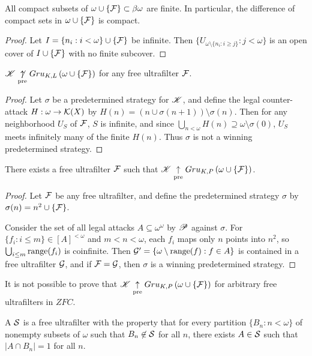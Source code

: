 \begin{lem}
  All compact subsets of $\omega\cup\{\mathcal{F}\}\subset\beta\omega$ are finite.
  In particular, the difference of compact sets in $\omega\cup\{\mathcal{F}\}$
  is compact.
\end{lem}

\begin{proof}
  Let $I=\{n_i:i<\omega\}\cup\{\mathcal{F}\}$ be infinite.
  Then $\{U_{\omega\setminus\{n_i:i\geq j\}}:j<\omega\}$ is an open cover of
  $I\cup\{\mathcal{F}\}$ with no finite subcover.
\end{proof}

\begin{thm}
  $\mathscr{K}\underset{\text{pre}}{\not\uparrow} Gru_{K,L}\left({\omega\cup\{\mathcal{F}\}}\right)$ for any free
  ultrafilter $\mathcal{F}$.
\end{thm}

\begin{proof}
  Let $\sigma$ be a predetermined strategy for $\mathscr{K}$, and define the legal
  counter-attack $H:\omega\to\mathcal{K}(X)$ by
  $H(n)=(n\cup\sigma(n+1))\setminus\sigma(n)$. Then for any neighborhood
  $U_S$ of $\mathcal{F}$, $S$ is infinite, and since
  $\bigcup_{n<\omega} H(n)\supseteq\omega\setminus\sigma(0)$, $U_S$ meets
  infinitely many of the finite $H(n)$. Thus $\sigma$ is not a winning
  predetermined strategy.
\end{proof}

\begin{thm}
  There exists a free ultrafilter $\mathcal{F}$ such that
  $\mathscr{K}\underset{\text{pre}}{\uparrow} Gru_{K,P}\left({\omega\cup\{\mathcal{F}\}}\right)$.
\end{thm}

\begin{proof}
  Let $\mathcal{F}$ be any free ultrafilter, and
  define the predetermined strategy $\sigma$ by
  $\sigma(n)=n^2\cup\{\mathcal{F}\}$.

  Consider the set of all legal attacks $A\subseteq\omega^\omega$ by
  $\mathscr{P}$ against $\sigma$. For $\{f_i:i\leq m\}\in [A]^{<\omega}$ and
  $m<n<\omega$, each $f_i$ maps only $n$ points into $n^2$, so
  $\bigcup_{i\leq m}\text{range}(f_i)$ is coinfinite.
  Then $\mathcal{G}'=\{\omega\setminus\text{range}(f) : f\in A\}$ is contained in a free
  ultrafilter $\mathcal{G}$, and if $\mathcal{F}=\mathcal{G}$, then $\sigma$ is a
  winning predetermined strategy.
\end{proof}

It is not possible to prove that $\mathscr{K}\underset{\text{pre}}{\uparrow} Gru_{K,P}\left({\omega\cup\{\mathcal{F}\}}\right)$
for arbitrary free ultrafilters in $ZFC$.

\begin{defn}
  A  $\mathcal{S}$ is a free ultrafilter with the
  property that for every
  partition $\{B_n : n < \omega\}$ of nonempty subsets of $\omega$ such that
  $B_n \not\in \mathcal{S}$ for all $n$, there exists $A \in \mathcal{S}$ such
  that $|A \cap B_n|=1$ for all $n$.
\end{defn}

